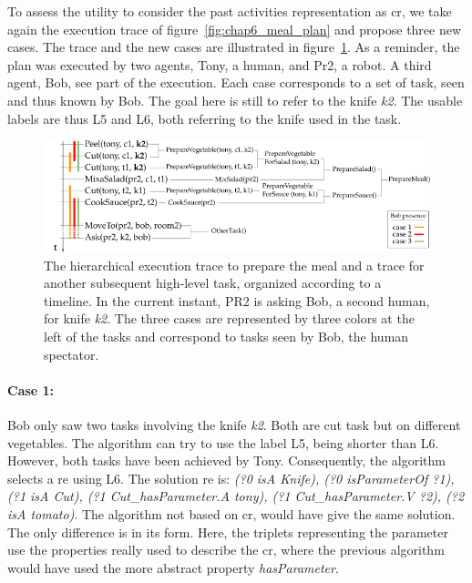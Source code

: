 To assess the utility to consider the past activities representation as \acrlong{cr}, we take again the execution trace of figure~\ref{fig:chap6_meal_plan} and propose three new cases. The trace and the new cases are illustrated in figure~\ref{fig:chap7_meal_plan}. As a reminder, the plan was executed by two agents, Tony, a human, and Pr2, a robot. A third agent, Bob, see part of the execution. Each case corresponds to a set of task, seen and thus known by Bob. The goal here is still to refer to the knife \textit{k2}. The usable labels are thus L5 and L6, both referring to the knife used in the task.

\begin{figure}[ht!]
\centering
\includegraphics[width=\textwidth]{figures/chapter7/prepare_meal_plan.png}
\caption{\label{fig:chap7_meal_plan} The hierarchical execution trace to prepare the meal and a trace for another subsequent high-level task, organized according to a timeline. In the current instant, PR2 is asking Bob, a second human, for knife \textit{k2}. The three cases are represented by three colors at the left of the tasks and correspond to tasks seen by Bob, the human spectator.}
\end{figure}

\paragraph{Case 1:} Bob only saw two tasks involving the knife \textit{k2}. Both are cut task but on different vegetables. The algorithm can try to use the label L5, being shorter than L6. However, both tasks have been achieved by Tony. Consequently, the algorithm selects a \acrshort{re} using L6. The solution \acrshort{re} is: \textit{(?0 isA Knife), (?0 isParameterOf ?1), (?1 isA Cut), (?1 Cut\_hasParameter.A tony), (?1 Cut\_hasParameter.V ?2), (?2 isA tomato)}. The algorithm not based on \acrshort{cr}, would have give the same solution. The only difference is in its form. Here, the triplets representing the parameter use the properties really used to describe the \acrshort{cr}, where the previous algorithm would have used the more abstract property \textit{hasParameter}.


